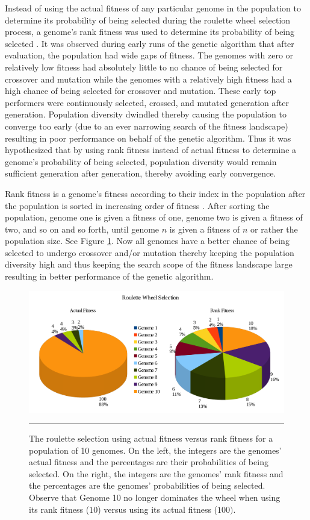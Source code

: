 Instead of using the actual fitness of any particular genome in the population to determine its probability of being selected during the roulette wheel selection process, a genome's rank fitness was used to determine its probability of being selected \cite{geneticalgorithm}. It was observed during early runs of the genetic algorithm that after evaluation, the population had wide gaps of fitness. The genomes with zero or relatively low fitness had absolutely little to no chance of being selected for crossover and mutation while the genomes with a relatively high fitness had a high chance of being selected for crossover and mutation. These early top performers were continuously selected, crossed, and mutated generation after generation. Population diversity dwindled thereby causing the population to converge too early (due to an ever narrowing search of the fitness landscape) resulting in poor performance on behalf of the genetic algorithm. Thus it was hypothesized that by using rank fitness instead of actual fitness to determine a genome's probability of being selected, population diversity would remain sufficient generation after generation, thereby avoiding early convergence. 

Rank fitness is a genome's fitness according to their index in the population after the population is sorted in increasing order of fitness \cite{genselect}. After sorting the population, genome one is given a fitness of one, genome two is given a fitness of two, and so on and so forth, until genome $n$ is given a fitness of $n$ or rather the population size. See Figure \ref{fig:roulette}. Now all genomes have a better chance of being selected to undergo crossover and/or mutation thereby keeping the population diversity high and thus keeping the search scope of the fitness landscape large resulting in better performance of the genetic algorithm.   

\begin{figure}[htbp]  
  \centering
  \includegraphics[scale=0.25]{../Figures/Chapter3/roulette.png}
  \rule{35em}{0.5pt}
  \caption[Roulette Wheel Selection]{The roulette selection using actual fitness versus rank fitness for a population of 10 genomes. On the left, the integers are the genomes' actual fitness and the percentages are their probabilities of being selected. On the right, the integers are the genomes' rank fitness and the percentages are the genomes' probabilities of being selected. Observe that Genome 10 no longer dominates the wheel when using its rank fitness ($10$) versus using its actual fitness ($100)$.}
  \label{fig:roulette}
\end{figure}

